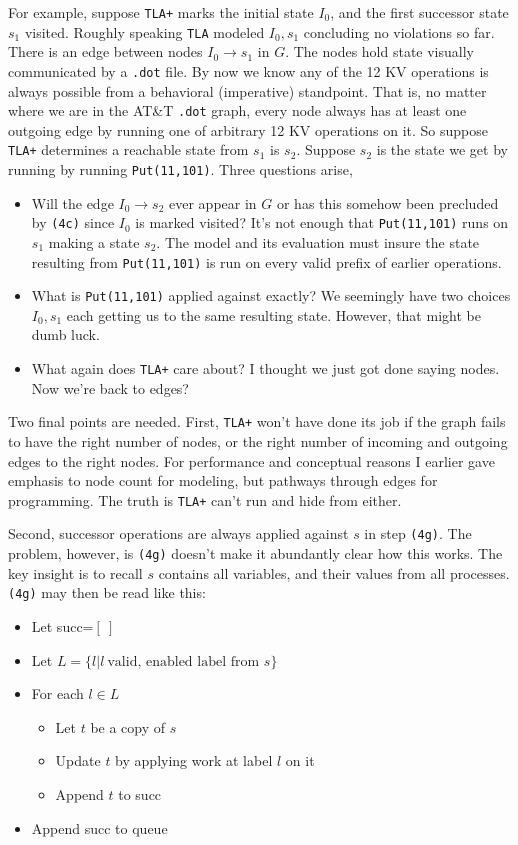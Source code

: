\documentclass[twocolumn]{article}
\begin{document}
For example, suppose \texttt{TLA+} marks the initial state $I_0$, and the first successor state $s_1$ visited. Roughly speaking \texttt{TLA} modeled $I_0, s_1$ concluding no violations so far. There is an edge between nodes $I_0 \rightarrow s_1$ in $G$. The nodes hold state visually communicated by a \texttt{.dot} file. By now we know any of the 12 KV operations is always possible from a behavioral (imperative) standpoint. That is, no matter where we are in the AT\&T \texttt{.dot} graph, every node always has at least one outgoing edge by running one of arbitrary 12 KV operations on it. So suppose \texttt{TLA+} determines a reachable state from $s_1$ is $s_2$. Suppose $s_2$ is the state we get by running by running \texttt{Put(11,101)}. Three questions arise,

\begin{itemize}
\item Will the edge $I_0 \rightarrow s_2$ ever appear in $G$ or has this somehow been precluded by \texttt{(4c)} since $I_0$ is marked visited? It's not enough that \texttt{Put(11,101)} runs on $s_1$ making a state $s_2$. The model and its evaluation must insure the state resulting from \texttt{Put(11,101)} is run on every valid prefix of earlier operations.
\item What is \texttt{Put(11,101)} applied against exactly? We seemingly have two choices $I_0, s_1$ each getting us to the same resulting state. However, that might be dumb luck.
\item What again does \texttt{TLA+} care about? I thought we just got done saying nodes. Now we're back to edges?
\end{itemize}

Two final points are needed. First, \texttt{TLA+} won't have done its job if the graph fails to have the right number of nodes, or the right number of incoming and outgoing edges to the right nodes. For performance and conceptual reasons I earlier gave emphasis to node count for modeling, but pathways through edges for programming. The truth is \texttt{TLA+} can't run and hide from either. 

Second, successor operations are always applied against $s$ in step \texttt{(4g)}. The problem, however, is \texttt{(4g)} doesn't make it abundantly clear how this works. The key insight is to recall $s$ contains all variables, and their values from all processes. \texttt{(4g)} may then be read like this:

\begin{itemize}
\item Let succ=$[\ ]$
\item Let $L=\{l|l\ \text{valid, enabled label from\ } s\}$
\item For each $l \in L$
	\begin{itemize}
	\item Let $t$ be a copy of $s$
	\item Update $t$ by applying work at label $l$ on it
	\item Append $t$ to succ
	\end{itemize}
	\item Append succ to queue
\end{itemize}
\end{document}
